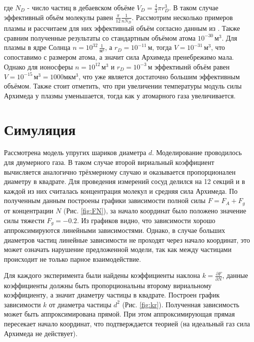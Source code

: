\documentclass[12pt]{article}
\begin{document}
где $N_D$ - число частиц в дебаевском объёме $V_D = \frac{4}{3} \pi r_D^3$. В таком случае эффективный объём молекулы равен 
$\frac{\pi}{12} \frac{1}{n N_D}$. 
Рассмотрим несколько примеров плазмы и рассчитаем для них эффективный объём согласно данным из \cite{Stat}. 
Также сравним полученные результаты со стандартным объёмом атома $10^{-30} \, \text{м}^3$. 
Для плазмы в ядре Солнца $n = 10^{32} \, \frac{1}{\text{м}^3}$, а $r_D = 10^{-11} \, \text{м}$, тогда 
$V = 10^{-31} \, \text{м}^3$, что сопоставимо с размером атома, а значит сила Архимеда 
пренебрежимо мала. Однако для ионосферы $n = 10^{12} \,\text{м}^3$ и $r_D = 10^{-3} \, \text{м}$ 
эффектиынй объём равен $V = 10^{-15} \, \text{м}^3 = 1000 \text{мкм}^3$, что уже является достаточно большим эффективным объёмом.       
Также стоит отметить, что при увеличении температуры модуль силы Архимеда у плазмы уменьшается, тогда как 
у атомарного газа увеличивается. 

\section{Симуляция}
Рассмотрена модель упругих шариков диаметра $d$. Моделирование проводилось для двумерного газа. 
В таком случае второй вириальный коэффициент вычисляется аналогично трёхмерному случаю и оказывается 
пропорционален диаметру в квадрате. Для проведения измерений сосуд делился на 12 секций и в каждой из 
них считалась концентрация молекул и средняя сила Архимеда. По полученным данным построены графики 
зависимости полной силы $F = F_A + F_g$ от концентрации $N$ (Рис. \ref{fig:FN}), за начало координат 
было положено значение силы тяжести $F_g = -0.2$. Из графиков видно, что 
зависимости хорошо аппроксимируются линейными зависимостями. Однако, в случае больших 
диаметров частиц линейные зависимости не проходят через начало координат, это может означать 
нарушение предложенной модели, так как между частицами происходит не только парное взаимодействие. 

Для каждого эксперимента были найдены коэффициенты наклона $k = \frac{\partial F}{\partial N}$, 
данные коэффициенты должны быть пропорциональны второму вириальному коэффициенту, а значит диаметру 
частицы в квадрате. Построен график зависимости $k$ от диаметра частицы $d^2$ (Рис. \ref{fig:kr}). 
Полученная зависимость может быть аппроксимирована прямой. При этом аппроксимирующая прямая 
пересекает начало координат, что подтверждается теорией (на идеальный газ сила Архимеда не действует).
\end{document}
